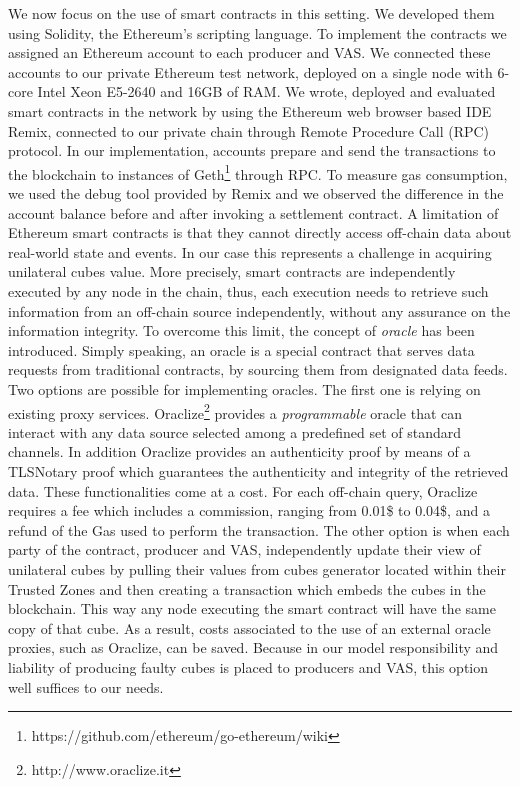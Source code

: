 \documentclass[chi_draft]{sigchi}
\begin{document}
{We now focus on the use of smart contracts in this setting.  We developed them using Solidity, the Ethereum's scripting language. To implement the contracts we assigned an Ethereum account to each producer and VAS. We connected these accounts to our private Ethereum test network, deployed on a single node with 6-core Intel Xeon E5-2640 and 16GB of RAM. We wrote, deployed and evaluated smart contracts in the network by using the Ethereum web browser based IDE Remix, connected to our private chain through Remote Procedure Call (RPC) protocol. In our implementation, accounts prepare and send the transactions to the blockchain to instances of Geth\footnote{https://github.com/ethereum/go-ethereum/wiki } through RPC. To measure gas consumption, we used the debug tool provided by Remix and we observed the difference in the account balance before and after invoking a settlement contract.
%
A limitation of Ethereum smart contracts is that they cannot directly access off-chain data about real-world state and events. In our case this represents a challenge in acquiring unilateral cubes value. More precisely, smart contracts are independently executed by any node in the chain, thus, each execution needs to retrieve such information from an off-chain source independently, without any assurance on the information integrity.
To overcome this limit, the concept of \emph{oracle} has been introduced. Simply speaking, an oracle is a special contract that serves data requests from traditional contracts, by sourcing them from designated data feeds. 
Two options are possible for implementing oracles. The first one is relying on existing proxy services. Oraclize\footnote{http://www.oraclize.it} provides a \emph{programmable} oracle that can interact with any data source selected among a predefined set of standard channels. In addition Oraclize provides an authenticity proof by means of a TLSNotary proof which guarantees the authenticity and integrity of the retrieved data. These functionalities come at a cost. For each off-chain query, Oraclize requires a fee which includes a commission, ranging from 0.01\$ to 0.04\$, and a refund of the Gas used to perform the transaction. 
The other option is when each party of the contract, producer and VAS, independently update their view of unilateral cubes by pulling their values from cubes generator located within their Trusted Zones and then creating a transaction which embeds the cubes in the blockchain. This way any node executing the smart contract will have the same copy of that cube. As a result, costs associated to the use of an external oracle proxies, such as Oraclize, can be saved. Because in our model responsibility and liability of producing faulty cubes is placed to producers and VAS, this option well suffices to our needs.

}
\end{document}
